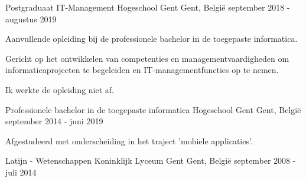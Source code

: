 


\begin{cventries}

\cventry
{Postgraduaat IT-Management} %
{Hogeschool Gent} %
{Gent, België} %
{september 2018 - augustus 2019} %
{ %
\begin{cvitems}
\item {Aanvullende opleiding bij de professionele bachelor in de toegepaste informatica.} 
\item{Gericht op het ontwikkelen van competenties en managementvaardigheden om informaticaprojecten te begeleiden en IT-managementfuncties op te nemen.}
 \item {Ik werkte de opleiding niet af.}
\end{cvitems}
}



\cventry
{Professionele bachelor in de toegepaste informatica} %
{Hogeschool Gent} %
{Gent, België} %
{september 2014 - juni 2019} %
{ %
\begin{cvitems}
\item {Afgestudeerd met onderscheiding in het traject 'mobiele applicaties'.}
\end{cvitems}
}

\cventry
{Latijn - Wetenschappen} %
{Koninklijk Lyceum Gent} %
{Gent, België} %
{september 2008 - juli 2014} %
{ %
}


\end{cventries}
